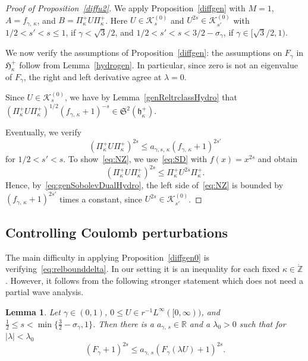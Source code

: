 \documentclass[10pt]{amsart}
\newtheorem{lemm}[cdrthm]{Lemma}
\theoremstyle{definition}
\newcommand*\gz{\mathbb{Z}}
\newcommand*\rz{\mathbb{R}}
\newcommand*\zp{\dot{\gz}}
\newcommand*\cK{\mathcal{K}}
\newcommand*\gH{\mathfrak{H}}
\newcommand*\gh{\mathfrak{h}}
\newcommand*\gS{\mathfrak{S}}
\newcommand*\ghpk{{\gh^+_\kappa}}
\newcommand*\ppp{\Pi^+_\kappa}
\begin{document}
\begin{proof}[Proof of Proposition~\ref{diffu2}]
We apply Proposition~\ref{diffgen} with $M=1$, $A = f_{\gamma,\,\kappa}$, and $B = \Pi_\kappa^+ U\Pi^+_\kappa$. Here $U\in\cK_{s}^{(0)}$ and $U^{2s}\in\cK_{s'}^{(0)}$ with $1/2<s'<s\leq1$, if $\gamma<\sqrt3/2$, and $1/2<s'<s<3/2-\sigma_\gamma$, if $\gamma\in[\sqrt3/2,1)$.

We now verify the assumptions of Proposition~\ref{diffgen}: the assumptions on $F_{\gamma}$ in $\gH_\kappa^+$ follow from Lemma~\ref{hydrogen}. In particular, since zero is not an eigenvalue of $F_{\gamma}$, the right and left derivative agree at $\lambda=0$.

Since $U\in\cK_{s}^{(0)}$, we have by Lemma~\ref{genReltrclassHydro} that $(\ppp U\ppp)^{1/2}(f_{\gamma,\,\kappa}+1)^{-s}\in \gS^2(\ghpk).$


Eventually, we verify
\begin{equation}\label{eq:NZ}
\left(\Pi_\kappa^+ U \Pi_\kappa^+\right)^{2s}
\leq a_{\gamma,s,\,\kappa}\left(f_{\gamma,\,\kappa}+1\right)^{2s'}
\end{equation}
for $1/2<s'<s$. To show~\eqref{eq:NZ}, we use~\eqref{eq:SD} with $f(x)=x^{2s}$ and obtain
\[
\left(\Pi^+_\kappa U \ppp\right)^{2s}
\leq \Pi_\kappa^+ U^{2s} \Pi_\kappa^+.
\]
Hence, by~\eqref{eq:genSobolevDualHydro}, the left side of~\eqref{eq:NZ} is bounded by $(f_{\gamma,\,\kappa}+1)^{2s'}$ times a constant, since $U^{2s}\in\cK_{s'}^{(0)}$.
\end{proof}

\subsection{Controlling Coulomb perturbations}\label{ss:controlingcoulomb}

The main difficulty in applying Proposition~\ref{diffgen0} is verifying~\eqref{eq:relbounddelta}. In our setting it is an inequality for each fixed $\kappa\in \zp$. However, it follows from the following stronger statement which does not need a partial wave analysis.
\begin{lemm}\label{boundpertcoulomb}
Let $\gamma\in(0,1)$, $0\leq U\in r^{-1}L^\infty([0,\infty))$, and $\tfrac12\leq s<\min\{\tfrac32-\sigma_\gamma,1\}$. Then there is a $a_{\gamma,\,s}\in\rz$ and a $\lambda_0>0$ such that for $|\lambda|<\lambda_0$
\begin{equation}
\left(F_\gamma+1\right)^{2s}
\leq a_{\gamma,\,s} \left(F_{\gamma}(\lambda U)+1\right)^{2s}.
\end{equation}
\end{lemm}
\end{document}
